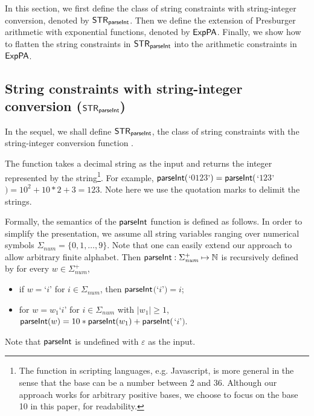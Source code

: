 
In this section, we first define the class of string constraints with string-integer conversion, denoted by ${\sf STR}_{\textsf{parseInt}}$. Then we define the extension of Presburger arithmetic with exponential functions, denoted by ${\sf ExpPA}$. Finally, we show how to flatten the string constraints in ${\sf STR}_{\textsf{parseInt}}$ into the arithmetic constraints in ${\sf ExpPA}$.

\subsection{String constraints with string-integer conversion (${\sf STR}_{\textsf{parseInt}}$)}

In the sequel, we shall define ${\sf STR}_{\textsf{parseInt}}$, the class of string constraints with the string-integer conversion function {\parseInt}.

The function  {\parseInt} takes a decimal string as the input and returns the integer represented by the string\footnote{The {\parseInt} function in scripting languages, e.g. Javascript, is more general in the sense that the base can be a number between 2 and 36. Although our approach works for arbitrary positive bases, we choose to focus on the base 10 in this paper, for readability.}.
For example,
${\textsf{parseInt}}($`$0123$'$) = {\textsf{parseInt}}($`$123$'$)=10^2+10*2+3 = 123$. 
Note here we use the quotation marks to delimit the strings.

Formally, the semantics of the $\textsf{parseInt}$ function is defined as follows. 
In order to simplify the presentation, we assume all string variables ranging over numerical symbols $\Sigma_{\textit{num}}=\{0,1, \ldots, 9\}$. Note that one can easily extend our approach to allow arbitrary finite alphabet. Then ${\textsf{parseInt}}: \Sigma_{\textit{num}}^+ \mapsto \mathbb{N}$ is recursively defined by
    for every $w\in \Sigma_{\textit{num}}^+$,
    \begin{itemize}
        \item  if $w=$`$i$' for $i \in \Sigma_{\textit{num}}$, then ${\textsf{parseInt}}$$($`$i$'$)=i$;
        \item for $w = w_1$`$i$' for $i \in \Sigma_{\textit{num}}$ with $\vert w_1\vert  \ge 1$, 
        ${\textsf{parseInt}}(w) = 10*{\textsf{parseInt}}(w_1)+{\textsf{parseInt}}($`$i$'$)$.
    \end{itemize} 
Note that $\textsf{parseInt}$ is undefined with $\varepsilon$ as the input.


